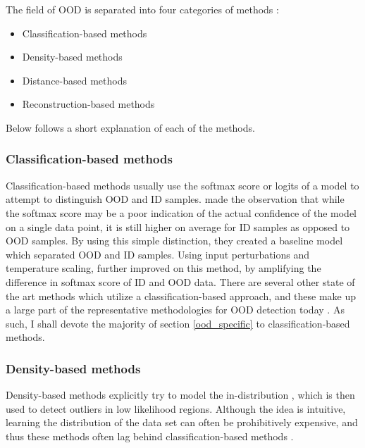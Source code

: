 \documentclass[conference]{IEEEtran}
\begin{document}
The field of OOD is separated into four categories of methods \cite{oodoverview}:

\begin{itemize}
  \item Classification-based methods
  \item Density-based methods
  \item Distance-based methods
  \item Reconstruction-based methods
\end{itemize}

Below follows a short explanation of each of the methods.
\\

\subsubsection{Classification-based methods}

Classification-based methods usually use the softmax score or logits of a model to attempt to distinguish OOD and ID samples. \cite{oodbaseline} made the observation that while the softmax score may be a poor indication of the actual confidence of the model on a single data point, it is still higher on average for ID samples as opposed to OOD samples. By using this simple distinction, they created a baseline model which separated OOD and ID samples. Using input perturbations and temperature scaling, \cite{odin} further improved on this method, by amplifying the difference in softmax score of ID and OOD data. There are several other state of the art methods which utilize a classification-based approach, and these make up a large part of the representative methodologies for OOD detection today \cite[8]{oodoverview}. As such, I shall devote the majority of section \ref{ood_specific} to classification-based methods.
\\

\subsubsection{Density-based methods}

Density-based methods explicitly try to model the in-distribution \cite{oodoverview}, which is then used to detect outliers in low likelihood regions. Although the idea is intuitive, learning the distribution of the data set can often be prohibitively expensive, and thus these methods often lag behind classification-based methods \cite{oodoverview}.
\\
\end{document}
